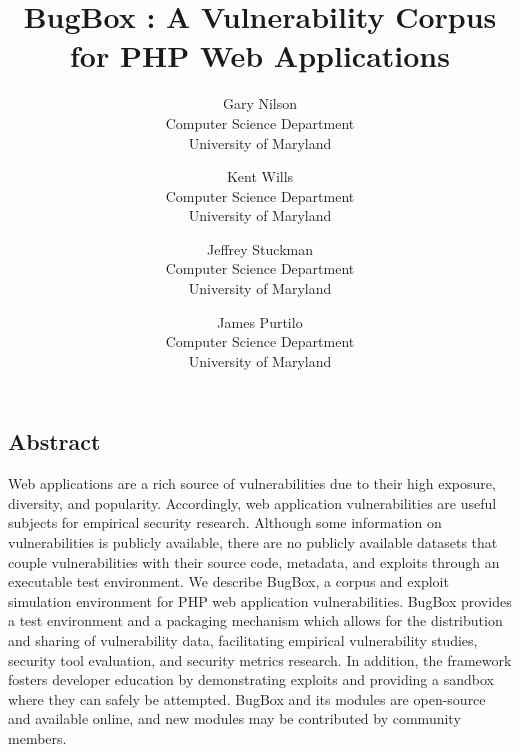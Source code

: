\documentclass[letterpaper,twocolumn,10pt]{article}
\begin{document}
\date{}


\title{\Large \bf BugBox : A Vulnerability Corpus for PHP Web Applications}


\author{
{\rm Gary Nilson}\\
Computer Science Department\\
University of Maryland
\and
{\rm Kent Wills}\\
Computer Science Department\\
University of Maryland
\and
{\rm Jeffrey Stuckman}\\
Computer Science Department\\
University of Maryland
\and
{\rm James Purtilo}\\
Computer Science Department\\
University of Maryland
} %

\maketitle



 
 

\subsection*{Abstract}

Web applications are a rich source of vulnerabilities due to their high exposure, diversity, and popularity. Accordingly, web application vulnerabilities are useful subjects for empirical security research. Although some information on vulnerabilities is publicly available, there are no publicly available datasets that couple vulnerabilities with their source code, metadata, and exploits through an executable test environment. We describe BugBox, a corpus and exploit simulation environment for PHP web application vulnerabilities. BugBox provides a test environment and a packaging mechanism which allows for the distribution and sharing of vulnerability data, facilitating empirical vulnerability studies, security tool evaluation, and security metrics research. In addition, the framework fosters developer education by demonstrating exploits and providing a sandbox where they can safely be attempted. BugBox and its modules are open-source and available online, and new modules may be contributed by community members.
\end{document}
